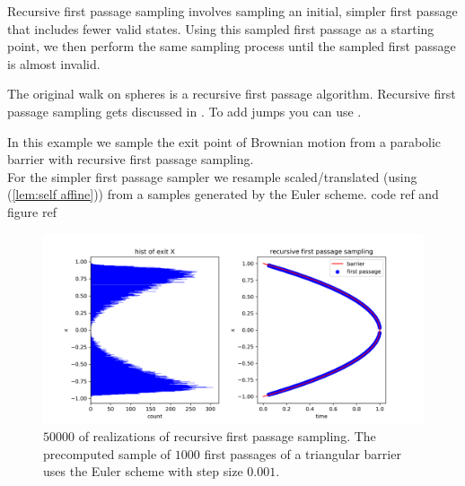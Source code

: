 \documentclass[a4paper,12pt]{article}
\begin{document}
\begin{technique}
    Recursive first passage sampling involves sampling an initial,
    simpler first passage that includes fewer valid states. Using
    this sampled first passage as a starting point, we
    then perform the same sampling process until the sampled
    first passage is almost invalid.
\end{technique}

\begin{related}
    The original walk on spheres is a recursive first passage algorithm.
    Recursive first passage sampling gets discussed in \cite{herrmann_first-passage_2016}.
    To add jumps you can use \cite{herrmann_exact_2021}.
\end{related}

\begin{example} \label{ex:recursive first passage sampling}
    In this example we sample the exit point of Brownian motion from a parabolic barrier
    with recursive first passage sampling. \\
    For the simpler first passage sampler we resample scaled/translated
    (using (\ref{lem:self affine})) from a samples generated
    by the Euler scheme.  code ref and figure ref

    \begin{figure}[ht!]
        \centering
        \includegraphics[width=1\textwidth]{plots/recursive first passage para.png}
        \caption{ $50000$ of realizations of recursive first passage sampling.
            The precomputed sample of $1000$ first passages of a triangular barrier
            uses the Euler scheme with step size $0.001$.}
        \label{fig:recursive first passage para}
    \end{figure}
\end{example}
\end{document}

